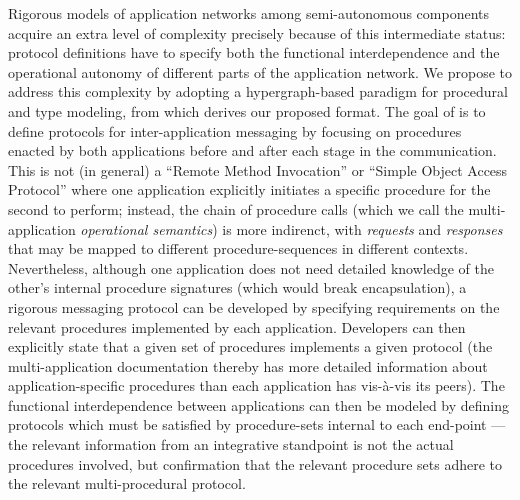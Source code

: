 \documentclass[11pt,letterpaper]{article}
\newcommand{\visavis}{vis-\`a-vis}
\newcommand{\ATextCClr}[1]{\textcolor{atcColor}{\textbf{#1}}}
\newcommand{\HMCL}{{\resizebox{!}{7.5pt}{\ATextCClr{HMCL}}}}
\newcommand{\p}[1]{

\vspace{1em}#1}
\newcommand{\q}[1]{{\fontfamily{qcr}\selectfont ``}#1{\fontfamily{qcr}\selectfont ''}}
\begin{document}
\p{Rigorous models of application networks among semi-autonomous 
components acquire an extra level of complexity precisely 
because of this intermediate status: protocol definitions 
have to specify both the functional interdependence 
and the operational autonomy of different parts of 
the application network.  We propose to 
address this complexity by adopting a hypergraph-based 
paradigm for procedural and type modeling, from 
which derives our proposed \HMCL{} format.  
The goal of \HMCL{} is to define protocols for 
inter-application messaging by focusing on 
procedures enacted by both applications before and 
after each stage in the communication.  This 
is not (in general) a \q{Remote Method Invocation} 
or \q{Simple Object Access Protocol} where one 
application explicitly initiates a specific procedure 
for the second to perform; instead, the chain of 
procedure calls (which we call the multi-application
\textit{operational semantics}) is more indirenct, 
with \textit{requests} and \textit{responses} that 
may be mapped to different procedure-sequences in 
different contexts.  Nevertheless, although 
one application does not need detailed 
knowledge of the other's internal procedure 
signatures (which would break encapsulation), 
a rigorous messaging protocol can be developed 
by specifying requirements on the relevant 
procedures implemented by each application.  
Developers can then explicitly state that 
a given set of procedures implements a given 
\HMCL{} protocol (the multi-application documentation 
thereby has more detailed information about 
application-specific procedures than each 
application has \visavis{} its peers).  The 
functional interdependence between applications can 
then be modeled by defining protocols which 
must be satisfied by procedure-sets internal 
to each end-point --- the relevant information 
from an integrative standpoint is not the 
actual procedures involved, but confirmation 
that the relevant procedure sets adhere 
to the relevant multi-procedural protocol.}
\end{document}
